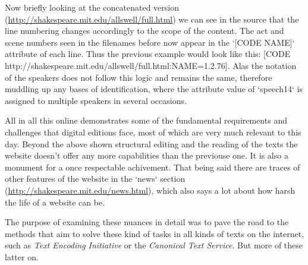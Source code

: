 Now briefly looking at the concatenated version (\url{http://shakespeare.mit.edu/allswell/full.html}) we can see in the source that the line numbering changes accordingly to the scope of the content. The act and scene numbers seen in the filenames before now appear in the `[CODE NAME]` attribute of each line. Thus the previous example would look like this: [CODE http://shakespeare.mit.edu/allswell/full.html:NAME=1.2.76]. Alas the notation of the speakers does not follow this logic and remains the same, therefore muddling up any bases of identification, where the attribute value of `speech14` is assigned to multiple speakers in several occasions.

All in all this online demonstrates some of the fundamental requirements and challenges that digital editions face, most of which are very much relevant to this day. Beyond the above shown structural editing and the reading of the texts the website doesn't offer any more capabilities than the previouse one. It is also a monument for a once respectable achivement. That being said there are traces of other features of the website in the `news` section (\url{http://shakespeare.mit.edu/news.html}), which also says a lot about how harsh the life of a website can be.   

The purpose of examining these nuances in detail was to pave the road to the methods that aim to solve these kind of tasks in all kinds of texts on the internet, such as \textit{Text Encoding Initiative} or the \textit{Canonical Text Service}. But more of these latter on. 